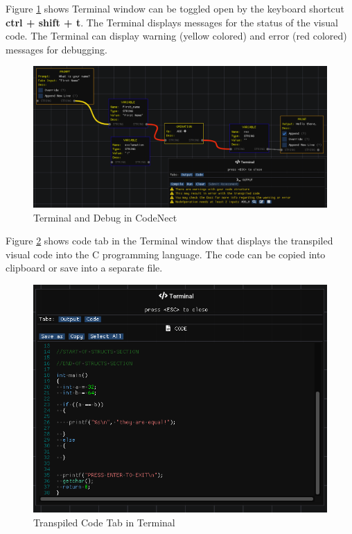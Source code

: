 \parx
Figure \ref{fig:cn_debug} shows Terminal window can be toggled open by the keyboard
shortcut \textbf{ctrl + shift + t}. The Terminal displays messages for the
status of the visual code. The Terminal can display warning (yellow colored)
and error (red colored) messages for debugging.

\begin{figure}[H]
	\centering
	\captionsetup{justification=centering}
	\captionsetup[figure]{list=yes}
	\includegraphics[width=\linewidth]{media/sc_debug.png}
	\caption[Terminal and Debug in CodeNect]{Terminal and Debug in CodeNect}
	\label{fig:cn_debug}
\end{figure}

\parx
Figure \ref{fig:cn_transpiled_code} shows code tab in the Terminal window that
displays the transpiled visual code into the C programming language. The code
can be copied into clipboard or save into a separate file.

\begin{figure}[H]
	\centering
	\captionsetup{justification=centering}
	\captionsetup[figure]{list=yes}
	\includegraphics[width=\linewidth]{media/sc_transpiled_code.png}
	\caption[Transpiled Code Tab in Terminal]{Transpiled Code Tab in Terminal}
	\label{fig:cn_transpiled_code}
\end{figure}

